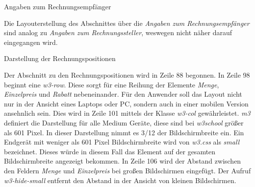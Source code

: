 \newpage
\begin{description}
	\item[Angaben zum Rechnungsempfänger]
    \hfill
     \label{des:Angaben_Rechnungsempfänger}
\end{description}
%
Die Layouterstellung des Abschnittes über die \textit{Angaben zum Rechnungsempfänger} sind analog zu \textit{Angaben zum Rechnungssteller}, weswegen nicht näher darauf eingegangen wird.


\begin{description}
	\item[Darstellung der Rechnungspositionen]
    \hfill
    \label{des:Rechnungspositionen}
\end{description}
%
Der Abschnitt zu den Rechnungspositionen wird in Zeile 88 begonnen. In Zeile 98 beginnt eine \textit{w3-row}. Diese sorgt für eine Reihung der Elemente \textit{Menge}, \textit{Einzelpreis} und \textit{Rabatt} nebeneinander. Für den Anwender soll das Layout nicht nur in der Ansicht eines Laptops oder PC, sondern auch in einer mobilen Version ansehnlich sein. Dies wird in Zeile 101 mittels der Klasse \textit{w3-col} gewährleistet. \textit{m3} definiert die Darstellung für alle Medium Geräte, diese sind bei \textit{w3school} größer als 601 Pixel. In dieser Darstellung nimmt es 3/12 der Bildschirmbreite ein. Ein Endgerät mit weniger als 601 Pixel Bildschirmbreite wird von \textit{w3.css} als \textit{small} bezeichnet. Dieses würde in diesem Fall das Element auf der gesamten Bildschirmbreite angezeigt bekommen. In Zeile 106 wird der Abstand zwischen den Feldern \textit{Menge} und \textit{Einzelpreis} bei großen Bildschirmen eingefügt. Der Aufruf \textit{w3-hide-small} entfernt den Abstand in der Ansicht von kleinen Bildschirmen.

